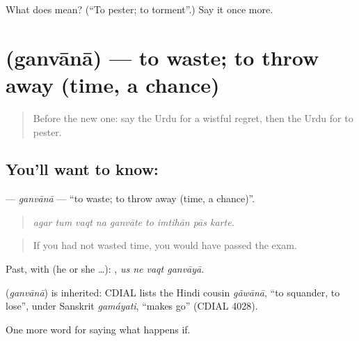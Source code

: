 \begin{tcolorbox}[breakable,colback=teal!4,colframe=teal!35!black,title={Before you move on}]
What does  mean? (\textquotedblleft{}To pester; to torment\textquotedblright{}.) Say it once more.
\end{tcolorbox}
\section[\texorpdfstring{\ur{گنوانا} (ganvānā)}{گنوانا (ganvānā)}]{ (ganvānā) — to waste; to throw away (time, a chance)}

\label{lesson:UR-C369-ganvana}



\begin{quote}
Before the new one: say the Urdu for a wistful regret, then the Urdu for to pester.
\end{quote}

\subsection*{You'll want to know: }
\textbf{} — \emph{ganvānā} — \textquotedblleft{}to waste; to throw away (time, a chance)\textquotedblright{}.

\begin{quote}
        
\end{quote}

\begin{quote}
\emph{agar tum vaqt na ganvāte to imtihān pās karte.}
\end{quote}

\begin{quote}
If you had not wasted time, you would have passed the exam.
\end{quote}

Past, with  (he or she …):    , \emph{us ne vaqt ganvāyā}.

\begin{cousinweb}
\textbf{} (\emph{ganvānā}) is inherited: CDIAL lists the Hindi cousin \emph{gãwānā}, \textquotedblleft{}to squander, to lose\textquotedblright{}, under Sanskrit \emph{gamáyati}, \textquotedblleft{}makes go\textquotedblright{} (CDIAL 4028).
\end{cousinweb}

\begin{grammarlens}[title={What you've built}]
One more word for saying what happens if.
\end{grammarlens}

